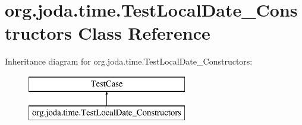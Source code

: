 \hypertarget{classorg_1_1joda_1_1time_1_1_test_local_date___constructors}{\section{org.\-joda.\-time.\-Test\-Local\-Date\-\_\-\-Constructors Class Reference}
\label{classorg_1_1joda_1_1time_1_1_test_local_date___constructors}
}
Inheritance diagram for org.\-joda.\-time.\-Test\-Local\-Date\-\_\-\-Constructors\-:\begin{figure}[H]
\begin{center}
\leavevmode
\includegraphics[height=2.000000cm]{classorg_1_1joda_1_1time_1_1_test_local_date___constructors}
\end{center}
\end{figure}
